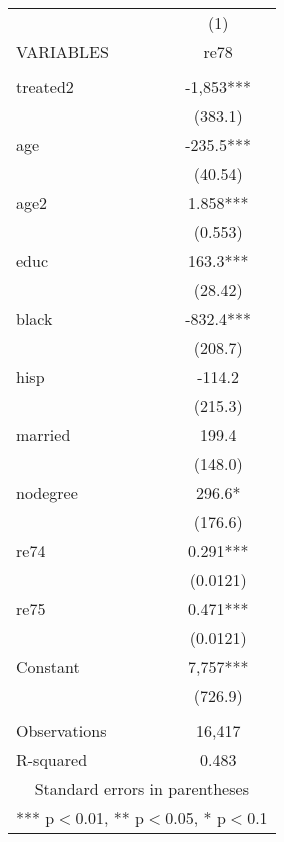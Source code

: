 \begin{tabular}{lc} \hline
 & (1) \\
VARIABLES & re78 \\ \hline
 &  \\
treated2 & -1,853*** \\
 & (383.1) \\
age & -235.5*** \\
 & (40.54) \\
age2 & 1.858*** \\
 & (0.553) \\
educ & 163.3*** \\
 & (28.42) \\
black & -832.4*** \\
 & (208.7) \\
hisp & -114.2 \\
 & (215.3) \\
married & 199.4 \\
 & (148.0) \\
nodegree & 296.6* \\
 & (176.6) \\
re74 & 0.291*** \\
 & (0.0121) \\
re75 & 0.471*** \\
 & (0.0121) \\
Constant & 7,757*** \\
 & (726.9) \\
 &  \\
Observations & 16,417 \\
 R-squared & 0.483 \\ \hline
\multicolumn{2}{c}{ Standard errors in parentheses} \\
\multicolumn{2}{c}{ *** p$<$0.01, ** p$<$0.05, * p$<$0.1} \\
\end{tabular}

